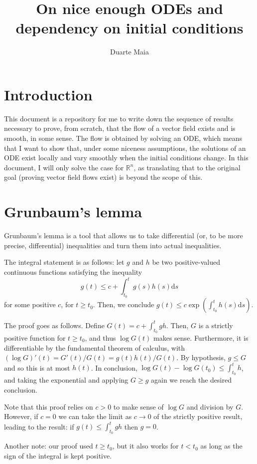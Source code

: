 \documentclass{article}
\title{On nice enough ODEs and dependency on initial conditions}
\author{Duarte Maia}
\date{}
\newcommand{\R}{\mathbb{R}}
\newcommand{\dd}{\mathrm{d}}
\begin{document}
\maketitle

\section{Introduction}

This document is a repository for me to write down the sequence of results necessary to prove, from scratch, that the flow of a vector field exists and is smooth, in some sense. The flow is obtained by solving an ODE, which means that I want to show that, under some niceness assumptions, the solutions of an ODE exist locally and vary smoothly when the initial conditions change. In this document, I will only solve the case for $\R^n$, as translating that to the original goal (proving vector field flows exist) is beyond the scope of this.

\section{Grunbaum's lemma}

Grunbaum's lemma is a tool that allows us to take differential (or, to be more precise, differential) inequalities and turn them into actual inequalities.

The integral statement is as follows: let $g$ and $h$ be two positive-valued continuous functions satisfying the inequality
\[g(t) \leq c + \int_{t_0}^t g(s) h(s) \dd s\]
for some positive $c$, for $t \geq t_0$. Then, we conclude $g(t) \leq c \exp(\int_{t_0}^t h(s) \dd s)$.

The proof goes as follows. Define $G(t) = c + \int_{t_0}^t gh$. Then, $G$ is a strictly positive function for $t \geq t_0$, and thus $\log G(t)$ makes sense. Furthermore, it is differentiable by the fundamental theorem of calculus, with $(\log G)'(t) = G'(t)/G(t) = g(t) h(t) / G(t)$. By hypothesis, $g \leq G$ and so this is at most $h(t)$. In conclusion, $\log G(t) - \log G(t_0) \leq \int_{t_0}^t h$, and taking the exponential and applying $G \geq g$ again we reach the desired conclusion.

Note that this proof relies on $c > 0$ to make sense of $\log G$ and division by $G$. However, if $c = 0$ we can take the limit as $c \to 0$ of the strictly positive result, leading to the result: if $g(t) \leq \int_{t_0}^t g h$ then $g = 0$.

Another note: our proof used $t \geq t_0$, but it also works for $t < t_0$ as long as the sign of the integral is kept positive.
\end{document}
